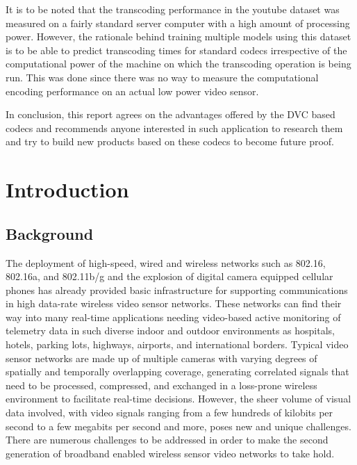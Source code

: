 \documentclass[letterpaper,12pt,titlepage,oneside,final]{report}
\begin{document}
    It is to be noted that the transcoding performance in the youtube dataset was measured on a fairly standard server computer with a high amount of processing power. However, the rationale behind training multiple models using this dataset is to be able to predict transcoding times for standard codecs irrespective of the computational power of the machine on which the transcoding operation is being run. This was done since there was no way to measure the computational encoding performance on an actual low power video sensor.

    In conclusion, this report agrees on the advantages offered by the DVC based codecs and recommends anyone interested in such application to research them and try to build new products based on these codecs to become future proof.
\cleardoublepage

\chapter{Introduction}
    \section{Background}

        The deployment of high-speed, wired and wireless networks such as 802.16, 802.16a, and 802.11b/g and the explosion of digital camera equipped cellular phones has already provided basic infrastructure for supporting communications in high data-rate wireless video sensor networks. These networks can find their way into many real-time applications needing video-based active monitoring of telemetry data in such diverse indoor and outdoor environments as hospitals, hotels, parking lots, highways, airports, and international borders. Typical video sensor networks are made up of multiple cameras with varying degrees of spatially and temporally overlapping coverage, generating correlated signals that need to be processed, compressed, and exchanged in a loss-prone wireless environment to facilitate real-time decisions. However, the sheer volume of visual data involved, with video signals ranging from a few hundreds of kilobits per second to a few megabits per second and more, poses new and unique challenges. There are numerous challenges to be addressed in order to make the second generation of broadband enabled wireless sensor video networks to take hold.
\end{document}
